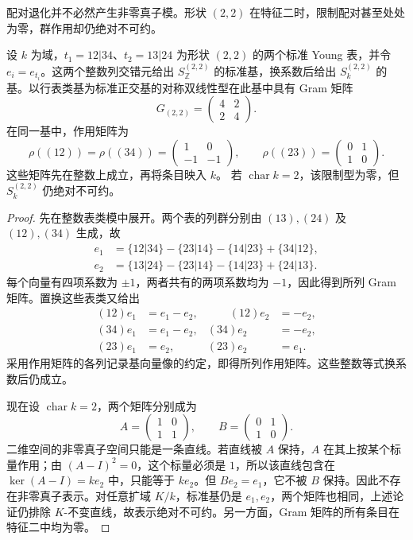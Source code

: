 配对退化并不必然产生非零真子模。形状 \((2,2)\) 在特征二时，限制配对甚至处处为零，群作用却仍绝对不可约。

\begin{proposition}\label{b5:prop:specht-22-char-two}
	设 \(k\) 为域，\(t_1=12|34\)、\(t_2=13|24\) 为形状 \((2,2)\) 的两个标准 Young 表，并令 \(e_i=e_{t_i}\)。这两个整数列交错元给出 \(S_{\mathbb Z}^{(2,2)}\) 的标准基，换系数后给出 \(S_k^{(2,2)}\) 的基。以行表类基为标准正交基的对称双线性型在此基中具有 Gram 矩阵
	\[
		G_{(2,2)}=\begin{pmatrix}4&2\\2&4\end{pmatrix}.
	\]
	在同一基中，作用矩阵为
	\[
		\rho((12))=\rho((34))=\begin{pmatrix}1&0\\-1&-1\end{pmatrix},
		\qquad
		\rho((23))=\begin{pmatrix}0&1\\1&0\end{pmatrix}.
	\]
	这些矩阵先在整数上成立，再将条目映入 \(k\)。 若 \(\operatorname{char}k=2\)，该限制型为零，但 \(S_k^{(2,2)}\) 仍绝对不可约。
\end{proposition}
\begin{proof}
	先在整数表类模中展开。两个表的列群分别由 \((13),(24)\) 及 \((12),(34)\) 生成，故
	\[
		\begin{aligned}
			e_1&=\{12|34\}-\{23|14\}-\{14|23\}+\{34|12\},\\
			e_2&=\{13|24\}-\{23|14\}-\{14|23\}+\{24|13\}.
		\end{aligned}
	\]
	每个向量有四项系数为 \(\pm1\)，两者共有的两项系数均为 \(-1\)，因此得到所列 Gram 矩阵。置换这些表类又给出
	\[
		\begin{aligned}
			(12)e_1&=e_1-e_2,&\qquad (12)e_2&=-e_2,\\
			(34)e_1&=e_1-e_2,& (34)e_2&=-e_2,\\
			(23)e_1&=e_2,& (23)e_2&=e_1.
		\end{aligned}
	\]
	采用作用矩阵的各列记录基向量像的约定，即得所列作用矩阵。这些整数等式换系数后仍成立。

	现在设 \(\operatorname{char}k=2\)，两个矩阵分别成为
	\[
		A=\begin{pmatrix}1&0\\1&1\end{pmatrix},\qquad
		B=\begin{pmatrix}0&1\\1&0\end{pmatrix}.
	\]
	二维空间的非零真子空间只能是一条直线。若直线被 \(A\) 保持，\(A\) 在其上按某个标量作用；由 \((A-I)^2=0\)，这个标量必须是 \(1\)，所以该直线包含在 \(\ker(A-I)=ke_2\) 中，只能等于 \(ke_2\)。但 \(Be_2=e_1\)，它不被 \(B\) 保持。因此不存在非零真子表示。对任意扩域 \(K/k\)，标准基仍是 \(e_1,e_2\)，两个矩阵也相同，上述论证仍排除 \(K\)-不变直线，故表示绝对不可约。另一方面，Gram 矩阵的所有条目在特征二中均为零。
\end{proof}

